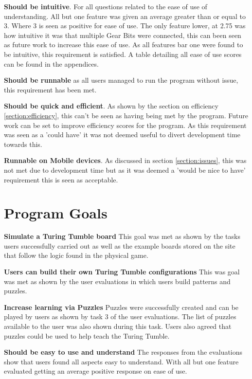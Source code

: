 \documentclass{l4proj}
\begin{document}
\textbf{Should be intuitive}. For all questions related to the ease of use of understanding. All but one feature was given an average greater than or equal to 3. Where 3 is seen as positive for ease of use. The only feature lower, at 2.75 was how intuitive it was that multiple Gear Bits were connected, this can been seen as future work to increase this ease of use. As all features bar one were found to be intuitive, this requirement is satisfied. A table detailing all ease of use scores can be found in the appendices. 

\textbf{Should be runnable} as all users managed to run the program without issue, this requirement has been met.

\textbf{Should be quick and efficient}. As shown by the section on efficiency \ref{section:efficiency}, this can't be seen as having being met by the program. Future work can be set to improve efficiency scores for the program. As this requirement was seen as a 'could have' it was not deemed useful to divert development time towards this. 

\textbf{Runnable on Mobile devices}. As discussed in section \ref{section:issues}, this was not met due to development time but as it was deemed a 'would be nice to have' requirement this is seen as acceptable. 

\section{Program Goals}

\textbf{Simulate a Turing Tumble board} This goal was met as shown by the tasks users successfully carried out as well as the example boards stored on the site that follow the logic found in the physical game.

\textbf{Users can build their own Turing Tumble configurations} This was goal was met as shown by the user evaluations in which users build patterns and puzzles.

\textbf{Increase learning via Puzzles} Puzzles were successfully created and can be played by users as shown by task 3 of the user evaluations. The list of puzzles available to the user was also shown during this task. Users also agreed that puzzles could be used to help teach the Turing Tumble.

\textbf{Should be easy to use and understand} The responses from the evaluations show that users found all aspects easy to understand. With all but one feature evaluated getting an average positive response on ease of use. 
\end{document}
